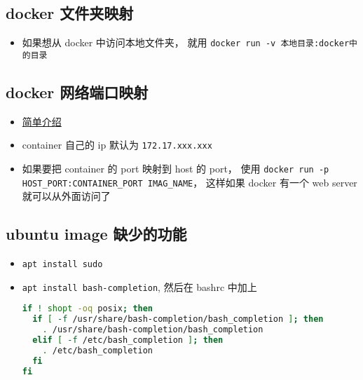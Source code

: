 \subsection{docker 文件夹映射}
\begin{itemize}
\item 如果想从 docker 中访问本地文件夹， 就用 \verb|docker run -v 本地目录:docker中的目录|
\end{itemize}

\subsection{docker 网络端口映射}
\begin{itemize}
\item \href{https://www.freecodecamp.org/news/how-to-get-a-docker-container-ip-address-explained-with-examples/}{简单介绍}
\item container 自己的 ip 默认为 \verb`172.17.xxx.xxx`
\item 如果要把 container 的 port 映射到 host 的 port， 使用 \verb`docker run -p HOST_PORT:CONTAINER_PORT IMAG_NAME`， 这样如果 docker 有一个 web server 就可以从外面访问了
\end{itemize}

\subsection{ubuntu image 缺少的功能}
\begin{itemize}
\item \verb`apt install sudo`
\item \verb`apt install bash-completion`, 然后在 bashrc 中加上
\begin{lstlisting}[language=bash]
if ! shopt -oq posix; then
  if [ -f /usr/share/bash-completion/bash_completion ]; then
    . /usr/share/bash-completion/bash_completion
  elif [ -f /etc/bash_completion ]; then
    . /etc/bash_completion
  fi
fi
\end{lstlisting}
\end{itemize}
